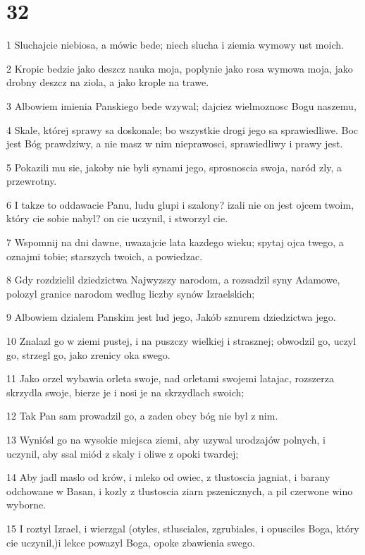 \chapter{32}

\par 1 Sluchajcie niebiosa, a mówic bede; niech slucha i ziemia wymowy ust moich.
\par 2 Kropic bedzie jako deszcz nauka moja, poplynie jako rosa wymowa moja, jako drobny deszcz na ziola, a jako krople na trawe.
\par 3 Albowiem imienia Panskiego bede wzywal; dajciez wielmoznosc Bogu naszemu,
\par 4 Skale, której sprawy sa doskonale; bo wszystkie drogi jego sa sprawiedliwe. Boc jest Bóg prawdziwy, a nie masz w nim nieprawosci, sprawiedliwy i prawy jest.
\par 5 Pokazili mu sie, jakoby nie byli synami jego, sprosnoscia swoja, naród zly, a przewrotny.
\par 6 I takze to oddawacie Panu, ludu glupi i szalony? izali nie on jest ojcem twoim, który cie sobie nabyl? on cie uczynil, i stworzyl cie.
\par 7 Wspomnij na dni dawne, uwazajcie lata kazdego wieku; spytaj ojca twego, a oznajmi tobie; starszych twoich, a powiedzac.
\par 8 Gdy rozdzielil dziedzictwa Najwyzszy narodom, a rozsadzil syny Adamowe, polozyl granice narodom wedlug liczby synów Izraelskich;
\par 9 Albowiem dzialem Panskim jest lud jego, Jakób sznurem dziedzictwa jego.
\par 10 Znalazl go w ziemi pustej, i na puszczy wielkiej i strasznej; obwodzil go, uczyl go, strzegl go, jako zrenicy oka swego.
\par 11 Jako orzel wybawia orleta swoje, nad orletami swojemi latajac, rozszerza skrzydla swoje, bierze je i nosi je na skrzydlach swoich;
\par 12 Tak Pan sam prowadzil go, a zaden obcy bóg nie byl z nim.
\par 13 Wyniósl go na wysokie miejsca ziemi, aby uzywal urodzajów polnych, i uczynil, aby ssal miód z skaly i oliwe z opoki twardej;
\par 14 Aby jadl maslo od krów, i mleko od owiec, z tlustoscia jagniat, i barany odchowane w Basan, i kozly z tlustoscia ziarn pszenicznych, a pil czerwone wino wyborne.
\par 15 I roztyl Izrael, i wierzgal (otyles, stlusciales, zgrubiales, i opusciles Boga, który cie uczynil,)i lekce powazyl Boga, opoke zbawienia swego.
